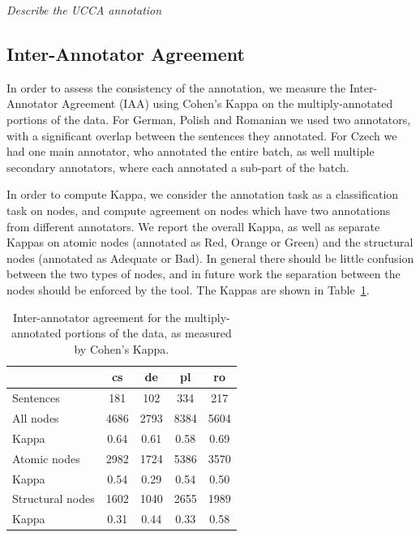 \documentclass[11pt]{article}
\newcommand{\tabref}[1]{Table~\ref{#1}}
\newcommand{\oa}[1]{}
\begin{document}
\emph{Describe the UCCA annotation}


\subsection{Inter-Annotator Agreement}
\label{sec:iaa}

\oa{what is the purpose of the BLEU binning? is it because low quality and high
quality translations often diverge in their agreement scores?}

In order to assess the consistency of the annotation, we measure the Inter-Annotator
Agreement (IAA) using Cohen's Kappa on the multiply-annotated portions of the data.
For German, Polish and Romanian we used two annotators, with a significant overlap
between the sentences they annotated. For Czech we had one main annotator, who
annotated the entire batch, as well multiple secondary annotators, where
each annotated a sub-part of the batch. \oa{i editted it. is what i wrote correct?}

In order to compute Kappa, we consider the annotation task as a classification task on 
nodes, and compute agreement on nodes which have two annotations from different annotators.
We report the overall Kappa, as well as separate Kappas on atomic
nodes (annotated as Red, Orange or Green) and the structural nodes (annotated
as Adequate or Bad). In general there should be little confusion between the two
types of nodes, and in future work the separation between the nodes should be enforced
by the tool\oa{but there may be some disagreement in the margins on what nodes are atomic and
  what are not}. The Kappas are shown in \tabref{tab:iaa}.

\begin{table}[!ht]
\begin{center}
\begin{tabular}{l|cccc}
 & cs & de & pl & ro \\
\hline
Sentences & 181 & 102 & 334 & 217 \\
\hline
All nodes & 4686   & 2793   & 8384   & 5604  \\
Kappa & 0.64   & 0.61   & 0.58   & 0.69  \\
\hline
Atomic nodes & 2982 & 1724 & 5386 & 3570 \\
Kappa & 0.54 & 0.29 & 0.54 & 0.50 \\
\hline
Structural nodes & 1602 & 1040 & 2655 & 1989 \\
Kappa & 0.31 & 0.44 & 0.33 & 0.58 \\
\end{tabular}
\caption{Inter-annotator agreement for the multiply-annotated portions of the data, as
measured by Cohen's Kappa. }
\label{tab:iaa}
\end{center}
\end{table}
\end{document}
